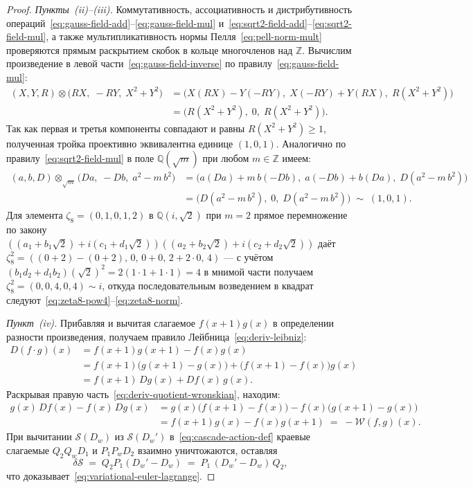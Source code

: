 \documentclass[11pt,a4paper]{article}
\theoremstyle{plain}
\theoremstyle{definition}
\begin{document}
\begin{proof}
\emph{Пункты~(ii)--(iii).} Коммутативность, ассоциативность и дистрибутивность операций~\eqref{eq:gauss-field-add}--\eqref{eq:gauss-field-mul} и~\eqref{eq:sqrt2-field-add}--\eqref{eq:sqrt2-field-mul}, а также мультипликативность нормы Пелля~\eqref{eq:pell-norm-mult} проверяются прямым раскрытием скобок в кольце многочленов над $\mathbb{Z}$. Вычислим произведение в левой части~\eqref{eq:gauss-field-inverse} по правилу~\eqref{eq:gauss-field-mul}:
\begin{align*}
  (X, Y, R) \otimes \bigl(RX,\; -RY,\; X^2 + Y^2\bigr)
  &= \bigl(X(RX) - Y(-RY),\; X(-RY) + Y(RX),\; R(X^2 + Y^2)\bigr) \\
  &= \bigl(R(X^2 + Y^2),\; 0,\; R(X^2 + Y^2)\bigr).
\end{align*}
Так как первая и третья компоненты совпадают и равны $R(X^2 + Y^2) \ge 1$, полученная тройка проективно эквивалентна единице $(1, 0, 1)$. Аналогично по правилу~\eqref{eq:sqrt2-field-mul} в поле $\mathbb{Q}(\sqrt{m})$ при любом $m \in \mathbb{Z}$ имеем:
\begin{align*}
  (a, b, D) \otimes_{\sqrt{m}} \bigl(Da,\; -Db,\; a^2 - m\,b^2\bigr)
  &= \bigl(a(Da) + m\,b(-Db),\; a(-Db) + b(Da),\; D(a^2 - m\,b^2)\bigr) \\
  &= \bigl(D(a^2 - m\,b^2),\; 0,\; D(a^2 - m\,b^2)\bigr) \;\sim\; (1, 0, 1).
\end{align*}
Для элемента $\zeta_8 = (0, 1, 0, 1, 2)$ в $\mathbb{Q}(i, \sqrt{2})$ при $m = 2$ прямое перемножение по закону $((a_1 + b_1\sqrt{2}) + i(c_1 + d_1\sqrt{2}))((a_2 + b_2\sqrt{2}) + i(c_2 + d_2\sqrt{2}))$ даёт $\zeta_8^2 = ((0 + 2) - (0 + 2),\, 0,\, 0 + 0,\, 2 + 2\cdot 0,\, 4)$ --- с учётом $(b_1 d_2 + d_1 b_2)(\sqrt{2})^2 = 2(1\cdot 1 + 1\cdot 1) = 4$ в мнимой части получаем $\zeta_8^2 = (0, 0, 4, 0, 4) \sim i$, откуда последовательным возведением в квадрат следуют~\eqref{eq:zeta8-pow4}--\eqref{eq:zeta8-norm}.

\emph{Пункт~(iv).} Прибавляя и вычитая слагаемое $f(x+1)g(x)$ в определении разности произведения, получаем правило Лейбница~\eqref{eq:deriv-leibniz}:
\begin{align*}
  D(f\cdot g)(x) &= f(x+1)g(x+1) - f(x)g(x) \\
  &= f(x+1)\bigl(g(x+1) - g(x)\bigr) + \bigl(f(x+1) - f(x)\bigr)g(x) \\
  &= f(x+1)\,Dg(x) + Df(x)\,g(x).
\end{align*}
Раскрывая правую часть~\eqref{eq:deriv-quotient-wronskian}, находим:
\begin{align*}
  g(x)\,Df(x) - f(x)\,Dg(x) &= g(x)\bigl(f(x+1) - f(x)\bigr) - f(x)\bigl(g(x+1) - g(x)\bigr) \\
  &= f(x+1)g(x) - f(x)g(x+1) \;=\; -\mathcal{W}(f, g)(x).
\end{align*}
При вычитании $\mathcal{S}(D_w)$ из $\mathcal{S}(D_w')$ в~\eqref{eq:cascade-action-def} краевые слагаемые $Q_2 Q_w D_1$ и $P_1 P_w D_2$ взаимно уничтожаются, оставляя
\begin{equation*}
  \delta\mathcal{S} \;=\; Q_2 P_1 (D_w' - D_w) \;=\; P_1\,(D_w' - D_w)\,Q_2,
\end{equation*}
что доказывает~\eqref{eq:variational-euler-lagrange}.


\end{proof}
\end{document}
